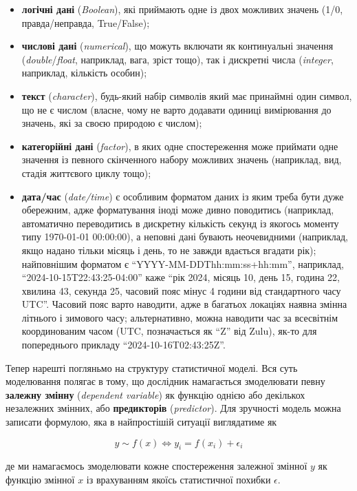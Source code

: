 \documentclass[
  11pt,
]{book}
\begin{document}
\begin{itemize}
\item
  \textbf{логічні дані} (\emph{Boolean}), які приймають одне із двох можливих значень (1/0, правда/неправда, True/False);
\item
  \textbf{числові дані} (\emph{numerical}), що можуть включати як континуальні значення (\emph{double}/\emph{float}, наприклад, вага, зріст тощо), так і дискретні числа (\emph{integer}, наприклад, кількість особин);
\item
  \textbf{текст} (\emph{character}), будь-який набір символів який має принаймні один символ, що не є числом (власне, чому не варто додавати одиниці вимірювання до значень, які за своєю природою є числом);
\item
  \textbf{категорійні дані} (\emph{factor}), в яких одне спостереження може приймати одне значення із певного скінченного набору можливих значень (наприклад, вид, стадія життєвого циклу тощо);
\item
  \textbf{дата/час} (\emph{date/time}) є особливим форматом даних із яким треба бути дуже обережним, адже форматування іноді може дивно поводитись (наприклад, автоматично переводитись в дискретну кількість секунд із якогось моменту типу 1970-01-01 00:00:00), а неповні дані бувають неочевидними (наприклад, якщо надано тільки місяць і день, то не завжди вдається вгадати рік); найповнішим форматом є ``YYYY-MM-DDThh:mm:ss+hh:mm'', наприклад, ``2024-10-15T22:43:25-04:00'' каже ``рік 2024, місяць 10, день 15, година 22, хвилина 43, секунда 25, часовий пояс мінус 4 години від стандартного часу UTC''. Часовий пояс варто наводити, адже в багатьох локаціях наявна змінна літнього і зимового часу; альтернативно, можна наводити час за всесвітнім координованим часом (UTC, позначається як ``Z'' від Zulu), як-то для попереднього прикладу ``2024-10-16T02:43:25Z''.
\end{itemize}

Тепер нарешті погляньмо на структуру статистичної моделі. Вся суть моделювання полягає в тому, що дослідник намагається змоделювати певну \textbf{залежну змінну} (\emph{dependent variable}) як функцію однією або декількох незалежних змінних, або \textbf{предикторів} (\emph{predictor}). Для зручності модель можна записати формулою, яка в найпростішій ситуації виглядатиме як

\[y \sim f(x) \Longleftrightarrow y_i = f(x_i) + \epsilon_i\]

де ми намагаємось змоделювати кожне спостереження залежної змінної \(y\) як функцію змінної \(x\) із врахуванням якоїсь статистичної похибки \(\epsilon\).
\end{document}
